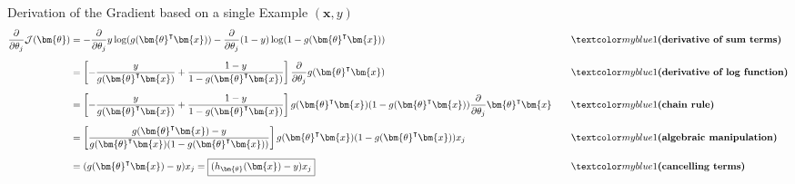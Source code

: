 \begin{frame}{Derivation of the Gradient based on a single Example $(\bm{x}, y)$}{}\optional
	\footnotesize
	\begin{alignat*}{2}
		\frac{\partial}{\partial \theta_j} \mathcal{J}(\bm{\theta})
			&= 	-\frac{\partial}{\partial \theta_j} y \log(g(\bm{\theta}^{\intercal} \bm{x})) -
			     	\frac{\partial}{\partial \theta_j} (1 - y) \log(1 - g(\bm{\theta}^{\intercal} \bm{x}))
			&& 	\quad\highlight{(derivative of sum terms)} \\[2mm]
			&=	\left[ -\frac{y}{g(\bm{\theta}^{\intercal} \bm{x})} + \frac{1 - y}{1 - g(\bm{\theta}^{\intercal} \bm{x})} \right]
				\frac{\partial}{\partial \theta_j} g(\bm{\theta}^{\intercal} \bm{x})
			&& 	\quad\highlight{(derivative of log function)} \\[2mm]
			&=	\left[ -\frac{y}{g(\bm{\theta}^{\intercal} \bm{x})} + \frac{1 - y}{1 - g(\bm{\theta}^{\intercal} \bm{x})} \right]
				g(\bm{\theta}^{\intercal} \bm{x}) (1 - g(\bm{\theta}^{\intercal} \bm{x}))
				\frac{\partial}{\partial \theta_j} \bm{\theta}^{\intercal} \bm{x}
			&& 	\quad\highlight{(chain rule)} \\[2mm]
			&= 	\left[ \frac{g(\bm{\theta}^{\intercal} \bm{x}) - y}{g(\bm{\theta}^{\intercal} \bm{x}) (1 - g(\bm{\theta}^{\intercal} \bm{x}))} \right]
				g(\bm{\theta}^{\intercal} \bm{x}) (1 - g(\bm{\theta}^{\intercal} \bm{x})) x_j
			&& 	\quad\highlight{(algebraic manipulation)} \\[2mm]
			&= 	(g(\bm{\theta}^{\intercal} \bm{x}) - y) x_j = \boxed{(h_{\bm{\theta}}(\bm{x}) - y) x_j}
			&& 	\quad\highlight{(cancelling terms)}
	\end{alignat*}
\end{frame}


